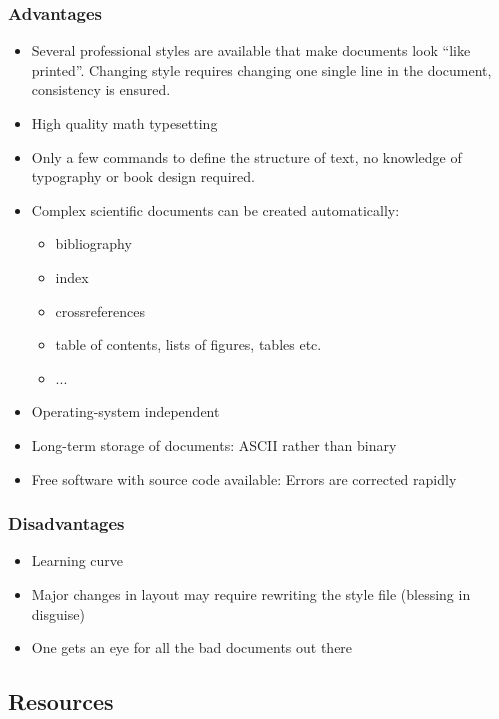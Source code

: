 \documentclass[presentation,hideothersubsections,final,10pt,american]{beamer}
\begin{document}
\begin{frame}
  \frametitle{Advantages}
  \begin{itemize}
     \item{Several professional styles are available that
         make documents look ``like printed''. Changing
         style requires changing one single line in the
         document, consistency is ensured.}
     \item{High quality math typesetting}
     \item{Only a few commands to define the structure of
         text, no knowledge of typography or book design
         required.}
     \item{Complex scientific documents can be created
         automatically:
         \begin{itemize}
           \item{bibliography}
           \item{index}
           \item{crossreferences}
           \item{table of contents, lists of figures,
               tables etc.}
           \item{...}
         \end{itemize} }
     \item{Operating-system independent}
     \item{Long-term storage of documents: ASCII rather
         than binary}
     \item{Free software with source code available: Errors
         are corrected rapidly}
  \end{itemize}
\end{frame}

\begin{frame}
  \frametitle{Disadvantages}
  \begin{itemize}
    \item{Learning curve}
    \item{Major changes in layout may require rewriting the
        style file (blessing in disguise)}
    \item{One gets an eye for all the bad documents out
        there}
  \end{itemize}
\end{frame}

\subsection{Resources}
\end{document}
